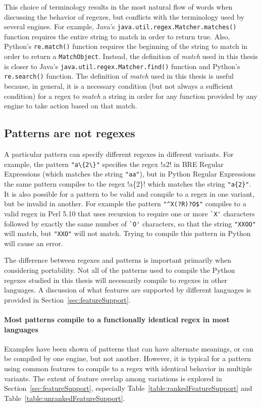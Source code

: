 This choice of terminology results in the most natural flow of words when discussing the behavior of regexes, but conflicts with the terminology used by several engines.  For example, Java's {\tt java.util.regex.Matcher.matches()} function requires the entire string to match in order to return true.  Also, Python's {\tt re.match()} function requires the beginning of the string to match in order to return a {\tt MatchObject}.  Instead, the definition of \emph{match} used in this thesis is closer to Java's {\tt java.util.regex.Matcher.find()} function and Python's {\tt re.search()} function.  The definition of \emph{match} used in this thesis is useful because, in general, it is a necessary condition (but not always a sufficient condition) for a regex to \emph{match} a string in order for any function provided by any engine to take action based on that match.

\subsection{Patterns are not regexes}
\label{sec:patternsAreNotRegexes}
A particular pattern can specify different regexes in different variants.  For example, the pattern \verb!"a\{2\}"! specifies the regex \cverb!a{2}! in BRE Regular Expressions (which matches the string \verb!"aa"!), but in Python Regular Expressions the same pattern compiles to the regex \cverb!a\{2\}! which matches the string \verb!"a{2}"!.
It is also possible for a pattern to be valid and compile to a regex in one variant, but be invalid in another.  For example the pattern \verb!"^X(?R)?O$"! compiles to a valid regex in Perl 5.10 that uses recursion to require one or more \verb!`X'! characters followed by exactly the same number of \verb!`O'! characters, so that the string \verb!"XXOO"! will match, but \verb!"XXO"! will not match.  Trying to compile this pattern in Python will cause an error.

The difference between regexes and patterns is important primarily when considering portability.  Not all of the patterns used to compile the Python regexes studied in this thesis will necessarily compile to regexes in other languages.  A discussion of what features are supported by different languages is provided in Section~\ref{sec:featureSupport}.

\paragraph{Most patterns compile to a functionally identical regex in most languages}
\label{sec:usuallyOk} Examples have been shown of patterns that can have alternate meanings, or can be compiled by one engine, but not another.  However, it is typical for a pattern using common features to compile to a regex with identical behavior in multiple variants.  The extent of feature overlap among variations is explored in Section~\ref{sec:featureSupport}, especially Table~\ref{table:rankedFeatureSupport} and Table~\ref{table:unrankedFeatureSupport}.
